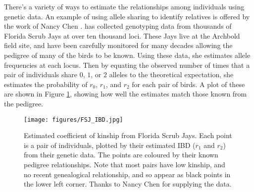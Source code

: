 {{There's a variety of ways to estimate the relationships among
individuals using genetic data.  An example of using allele sharing to identify relatives is offered by
the work of Nancy Chen \citep[in collaboration with Stepfanie
Aguillon, see ][]{chen:16,Aguillon:17}. \citeauthor{chen:16} has collected genotyping data from thousands of
Florida Scrub Jays at over ten thousand loci. These Jays live at the
Archbold field site, and have been carefully monitored for many
decades allowing the pedigree of many of the birds to be known.
Using these data, she estimates allele frequencies at each
locus. Then by equating the observed number of times that a pair of
individuals share $0$, $1$, or $2$ alleles to the theoretical
expectation, she estimates the probability of $r_0$, $r_1$, and
$r_2$ for each pair of birds. A plot of these are shown in Figure
\ref{fig:FSJ_IBD}, showing how well the estimates match those known
from the pedigree.


\begin{figure}
\begin{center}
\texttt{[image: figures/FSJ\_IBD.jpg]}
\end{center}
\caption[3cm]{Estimated coefficient
of kinship from Florida Scrub Jays. Each point is a pair of
individuals, plotted by their estimated IBD ($r_1$ and $r_2$) from their genetic data. The
points are coloured by their known pedigree relationships. Note that
most pairs have low kinship, and no recent genealogical relationship,
and so appear as black points in the lower left corner. Thanks to
Nancy Chen for supplying the data.  } \label{fig:FSJ_IBD}
\end{figure}

}}
